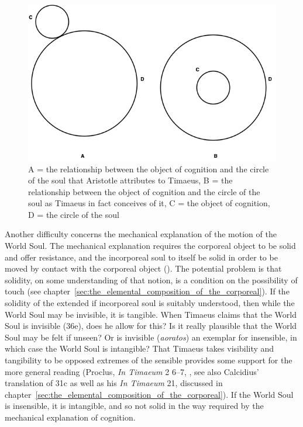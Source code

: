\begin{figure}[htbp]
	\centering
		\includegraphics[scale=0.4]{graphics/center_periphery.png}
	\caption{A = the relationship between the object of cognition and the circle of the soul that Aristotle attributes to Timaeus, B = the relationship between the object of cognition and the circle of the soul as Timaeus in fact conceives of it, C = the object of cognition, D = the circle of the soul}
	\label{fig:center_periphery}
\end{figure}

Another difficulty concerns the mechanical explanation of the motion of the World Soul. The mechanical explanation requires the corporeal object to be solid and offer resistance, and the incorporeal soul to itself be solid in order to be moved by contact with the corporeal object (\citealt[129--33]{Betegh:2019fq}). The potential problem is that solidity, on some understanding of that notion, is a condition on the possibility of touch (see chapter~\ref{sec:the_elemental_composition_of_the_corporeal}). If the solidity of the extended if incorporeal soul is suitably understood, then while the World Soul may be invisible, it is tangible. When Timaeus claims that the World Soul is invisible (36e), does he allow for this? Is it really plausible that the World Soul may be felt if unseen? Or is invisible (\emph{aoratos}) an exemplar for insensible, in which case the World Soul is intangible? That Timaeus takes visibility and tangibility to be opposed extremes of the sensible provides some support for the more general reading (Proclus, \emph{In Timaeum} 2 6--7, \citealt{Diehl:1903re}, see also Calcidius' translation of 31c as well as his \emph{In Timaeum} 21, discussed in chapter~\ref{sec:the_elemental_composition_of_the_corporeal}). If the World Soul is insensible, it is intangible, and so not solid in the way required by the mechanical explanation of cognition. 

